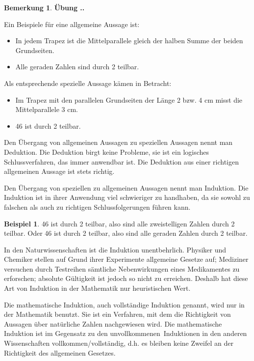 \documentclass[%
11pt,%
twoside,%
titlepage,%
swissgerman,%
headsepline%
]{scrartcl}
\newcommand{\faEyeLightGray}{\textcolor{lightgray}{\faEye}} %
\newcommand{\definition}[1]{\colorbox{emerald}{#1}}
\theoremstyle{definition}
\newtheorem{bsp}{Beispiel}[subsection] %
\newtheorem{bem}{Bemerkung}[subsection] %
\theoremstyle{plain}
\newcommand{\concatueb}[1]{ueb:#1}%
\newcommand{\concatlsg}[1]{lsg:#1}%
\newcounter{uebcounter}[section]
\renewcommand{\theuebcounter}{\thesection.\arabic{uebcounter}}  %
\newenvironment{uebenv}[1]{%
    \refstepcounter{uebcounter}
    \par\noindent\textbf{Übung \theuebcounter.}%
    \label{\concatueb{#1}}\hfill\hyperref[\concatlsg{#1}]{\faEyeLightGray}\par
}{%
    \par
}
\begin{document}
\begin{bem}
\begin{uebenv}{konvergenzerzwingen}
Ein Beispiele f\"ur eine allgemeine Aussage ist:
\begin{itemize}
\item In jedem Trapez ist die Mittelparallele gleich der halben Summe der beiden Grundseiten.
\item Alle geraden Zahlen sind durch 2 teilbar.
\end{itemize}

Als entsprechende spezielle Aussage k\"amen in Betracht:
\begin{itemize}
\item Im Trapez mit den parallelen Grundseiten der L\"ange 2 bzw. 4 cm misst die Mittelparallele 3 cm.
\item 46 ist durch 2 teilbar.
\end{itemize}

Den Übergang von allgemeinen Aussagen zu speziellen Aussagen nennt man \definition{Deduktion}. Die Deduktion birgt keine Probleme, sie ist ein logisches Schlussverfahren, das immer anwendbar ist. Die Deduktion aus einer richtigen allgemeinen Aussage ist stets richtig.

Den Übergang von speziellen zu allgemeinen Aussagen nennt man \definition{Induktion}.
Die Induktion ist in ihrer Anwendung viel schwieriger zu handhaben, da sie sowohl zu falschen als auch zu richtigen Schlussfolgerungen f\"uhren kann.

\begin{bsp}
46 ist durch 2 teilbar, also sind alle zweistelligen Zahlen durch 2 teilbar. Oder 46 ist durch 2 teilbar, also sind alle geraden Zahlen durch 2 teilbar.
\end{bsp}

In den Naturwissenschaften ist die Induktion unentbehrlich. Physiker und Chemiker stellen auf Grund ihrer Experimente allgemeine Gesetze auf; Mediziner versuchen durch Testreihen s\"amtliche Nebenwirkungen eines Medikamentes zu erforschen; absolute G\"ul\-tig\-keit ist jedoch so nicht zu erreichen. Deshalb hat diese Art von Induktion in der Mathematik nur heuristischen Wert.

Die mathematische Induktion, auch \definition{vollst\"andige Induktion} genannt, wird nur in der Mathematik benutzt. Sie ist ein Verfahren, mit dem die Richtigkeit von Aussagen \"uber nat\"urliche Zahlen nachgewiesen wird. Die mathematische Induktion ist im Gegensatz zu den \glqq unvollkommenen\grqq\ Induktionen in den anderen Wissenschaften vollkommen/voll\-st\"an\-dig, d.h. es bleiben keine Zweifel an der Richtigkeit des allgemeinen Gesetzes.


\end{uebenv}
\end{bem}
\end{document}
